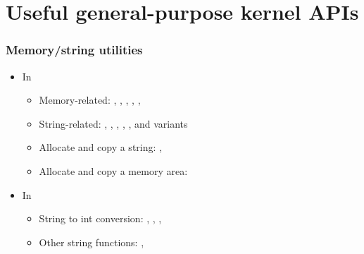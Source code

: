 \section{Useful general-purpose kernel APIs}

\begin{frame}
  \frametitle{Memory/string utilities}
  \begin{itemize}
  \item In 
    \begin{itemize}
    \item Memory-related: , ,
      , , , 
    \item String-related: , , ,
      , ,  and variants
    \item Allocate and copy a string: , 
    \item Allocate and copy a memory area: 
    \end{itemize}
  \item In 
    \begin{itemize}
    \item String to int conversion: ,
      , ,
    \item Other string functions: , 
    \end{itemize}
  \end{itemize}
\end{frame}

